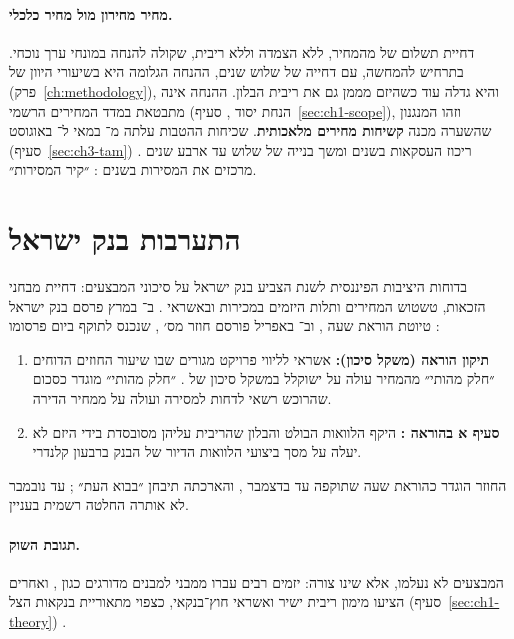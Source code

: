 \paragraph{מחיר מחירון מול מחיר כלכלי.} דחיית תשלום של  מהמחיר, ללא הצמדה וללא ריבית, שקולה להנחה במונחי ערך נוכחי. בתרחיש להמחשה, עם דחייה של שלוש שנים, ההנחה הגלומה היא  בשיעורי היוון של  (פרק~\ref{ch:methodology}), והיא גדלה עוד כשהיזם מממן גם את ריבית הבלון. ההנחה אינה מתבטאת במדד המחירים הרשמי (הנחת יסוד , סעיף~\ref{sec:ch1-scope}), וזהו המנגנון שהשערה  מכנה \textbf{קשיחות מחירים מלאכותית}. שכיחות ההטבות עלתה מ־ במאי ל־ באוגוסט  (סעיף~\ref{sec:ch3-tam}) \cite{mof_review_2026_08,nadlancenter_2026_08_promos}. ריכוז העסקאות בשנים  ומשך בנייה של שלוש עד ארבע שנים מרכזים את המסירות בשנים : ״קיר המסירות״.

\section{התערבות בנק ישראל}
\label{sec:ch3-boi}

בדוחות היציבות הפיננסית לשנת  הצביע בנק ישראל על סיכוני המבצעים: דחיית מבחני הזכאות, טשטוש המחירים ותלות היזמים במכירות ובאשראי \cite{boi_fsr2024h1,boi_fsr2024h2}. ב־ במרץ  פרסם בנק ישראל טיוטת הוראת שעה \cite{mof_review_2026_08}, וב־ באפריל  פורסם חוזר מס׳ , שנכנס לתוקף ביום פרסומו \cite{boi_circular2816}:
\begin{enumerate}
  \item \textbf{תיקון הוראה  (משקל סיכון):} אשראי לליווי פרויקט מגורים שבו שיעור החוזים הדוחים ״חלק מהותי״ מהמחיר עולה על  ישוקלל במשקל סיכון של . ״חלק מהותי״ מוגדר כסכום שהרוכש רשאי לדחות למסירה ועולה על  ממחיר הדירה.
  \item \textbf{סעיף א בהוראה :} היקף הלוואות הבולט והבלון שהריבית עליהן מסובסדת בידי היזם לא יעלה על  מסך ביצועי הלוואות הדיור של הבנק ברבעון קלנדרי.
\end{enumerate}
החוזר הוגדר כהוראת שעה שתוקפה עד  בדצמבר , והארכתה תיבחן ״בבוא העת״ \cite{boi_circular2816}; עד נובמבר  לא אותרה החלטה רשמית בעניין.

\paragraph{תגובת השוק.} המבצעים לא נעלמו, אלא שינו צורה: יזמים רבים עברו ממבני  למבנים מדורגים כגון , ואחרים הציעו מימון ריבית ישיר ואשראי חוץ־בנקאי, כצפוי מתאוריית בנקאות הצל (סעיף~\ref{sec:ch1-theory}) \cite{pozsar2010}.

